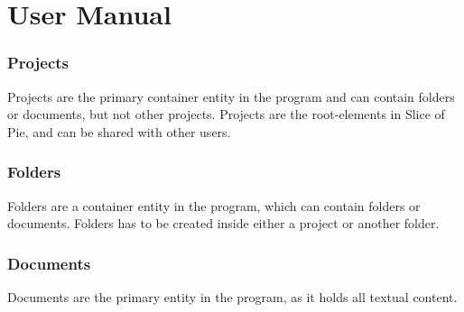 \section{User Manual}

\subsubsection{Projects}
Projects are the primary container entity in the program and can contain folders or documents, but not other projects.
Projects are the root-elements in Slice of Pie, and can be shared with other users.

\subsubsection{Folders}
Folders are a container entity in the program, which can contain folders or documents. Folders has to be created inside either a project or another folder.

\subsubsection{Documents}
Documents are the primary entity in the program, as it holds all textual content.



